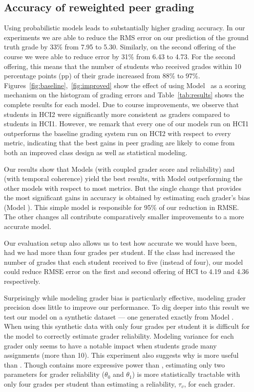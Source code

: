 \subsection{Accuracy of reweighted peer grading}
Using probabilistic models leads to substantially higher grading accuracy. In our experiments we are able to reduce the
RMS error on our prediction of the ground truth grade by
33\% from 7.95 to 5.30. Similarly, on the second offering of
the course we were able to reduce error by 31\% from 6.43
to 4.73. For the second offering, this means that the number of students who received grades within 10 percentage
points (pp) of their grade increased from 88\% to 97\%. Figures~\ref{fig:baseline},~\ref{fig:improved} show the effect of using Model~\PGthree
as a scoring mechanism on the histogram of grading errors and Table~\ref{tab:results} shows the
complete results for each model. Due to course improvements, we observe that students
in HCI2 were significantly more consistent as graders compared to students in HCI1. However, we remark that every
one of our models run on HCI1 outperforms the baseline
grading system run on HCI2 with respect to every metric,
indicating that the best gains in peer grading are likely to
come from both an improved class design as well as statistical modeling.

Our results show that Models \PGthree (with coupled grader score and
reliability) and \PGtwo (with temporal coherence) yield the best results,
with Model \PGthree outperforming the other models with respect to most metrics.
But the single change that provides the
most significant gains in accuracy is obtained by estimating each grader's bias (Model \PGonebias). This simple
model is responsible for 95\% of our reduction in RMSE.
The other changes 
all contribute comparatively smaller improvements
to a more accurate model.

Our evaluation setup also allows us to test how accurate we would have been, had we had more than four grades per student. If the class had increased the number of grades that each student received to five (instead of four), our model could reduce RMSE error on the first and second offering of HCI to 4.19 and 4.36  respectively. 


Surprisingly while modeling grader bias is particularly effective, modeling grader precision does little to improve our
performance. To dig deeper into this result we test our
model on a synthetic dataset --- one generated exactly from
Model \PGone . When using this synthetic data with only
four grades per student it is difficult for the model to
correctly estimate grader reliability. Modeling variance for
each grader only seems to have a notable impact when students grade many assignments 
(more than 10). This experiment also suggests why \PGthree is more useful than \PGone .
Though \PGone contains more expressive power
than \PGthree, estimating only two parameters for grader reliability ($\theta_0$ and $\theta_1$) is more statistically tractable with only
four grades per student than estimating a reliability, $\tau_v$, for
each grader. 

